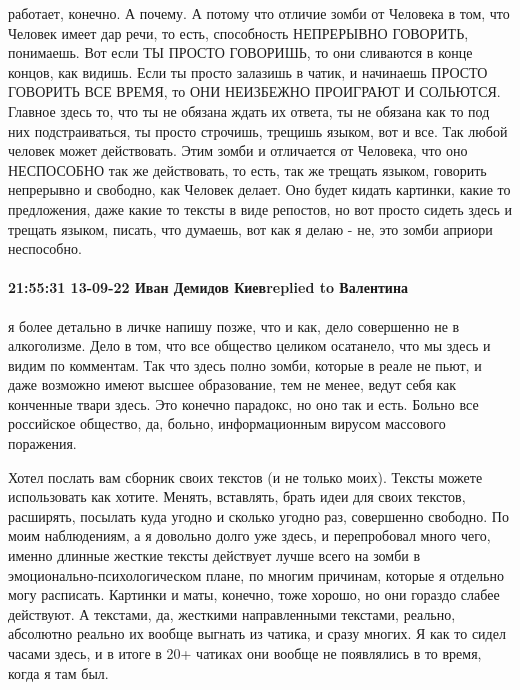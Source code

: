 


работает, конечно. А почему. А потому что отличие зомби от Человека в том, что
Человек имеет дар речи, то есть, способность НЕПРЕРЫВНО ГОВОРИТЬ, понимаешь.
Вот если ТЫ ПРОСТО ГОВОРИШЬ, то они сливаются в конце концов, как видишь. Если
ты просто залазишь в чатик, и начинаешь ПРОСТО ГОВОРИТЬ ВСЕ ВРЕМЯ, то ОНИ
НЕИЗБЕЖНО ПРОИГРАЮТ И СОЛЬЮТСЯ. Главное здесь то, что ты не обязана ждать их
ответа, ты не обязана как то под них подстраиваться, ты просто строчишь,
трещишь языком, вот и все. Так любой человек может действовать. Этим зомби и
отличается от Человека, что оно НЕСПОСОБНО так же действовать, то есть, так же
трещать языком, говорить непрерывно и свободно, как Человек делает. Оно будет
кидать картинки, какие то предложения, даже какие то тексты в виде репостов, но
вот просто сидеть здесь и трещать языком, писать, что думаешь, вот как я делаю
- не, это зомби априори неспособно.


\paragraph{21:55:31 13-09-22 Иван Демидов Киевreplied to Валентина}

я более детально в личке напишу позже, что и как, дело совершенно не в
алкоголизме. Дело в том, что все общество целиком осатанело, что мы здесь и
видим по комментам. Так что здесь полно зомби, которые в реале не пьют, и даже
возможно имеют высшее образование, тем не менее, ведут себя как конченные твари
здесь. Это конечно парадокс, но оно так и есть. Больно все российское общество,
да, больно, информационным вирусом массового поражения.


Хотел послать вам сборник своих текстов (и не только моих). Тексты можете
использовать как хотите. Менять, вставлять, брать идеи для своих текстов,
расширять, посылать куда угодно и сколько угодно раз, совершенно свободно. По
моим наблюдениям, а я довольно долго уже здесь, и перепробовал много чего,
именно длинные жесткие тексты действует лучше всего на зомби в
эмоционально-психологическом плане, по многим причинам, которые я отдельно могу
расписать. Картинки и маты, конечно, тоже хорошо, но они гораздо слабее
действуют. А текстами, да, жесткими направленными текстами, реально, абсолютно
реально их вообще выгнать из чатика, и сразу многих. Я как то сидел часами
здесь, и в итоге в 20+ чатиках они вообще не появлялись в то время, когда я там
был.

